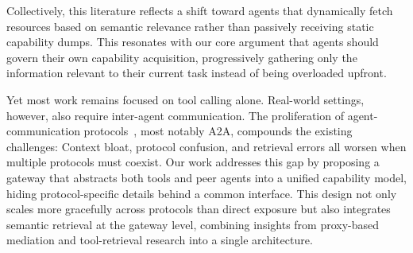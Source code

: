 Collectively, this literature reflects a shift toward agents that dynamically fetch resources based on semantic relevance rather than passively receiving static capability dumps. This resonates with our core argument that agents should govern their own capability acquisition, progressively gathering only the information relevant to their current task instead of being overloaded upfront. 

Yet most work remains focused on tool calling alone. Real-world settings, however, also require inter-agent communication. The proliferation of agent-communication protocols~\cite{ehtesham2025surveyagentinteroperabilityprotocols}, most notably A2A, compounds the existing challenges: Context bloat, protocol confusion, and retrieval errors all worsen when multiple protocols must coexist. 
Our work addresses this gap by proposing a gateway that abstracts both tools and peer agents into a unified capability model, hiding protocol-specific details behind a common interface. This design not only scales more gracefully across protocols than direct exposure but also integrates semantic retrieval at the gateway level, combining insights from proxy-based mediation and tool-retrieval research into a single architecture.